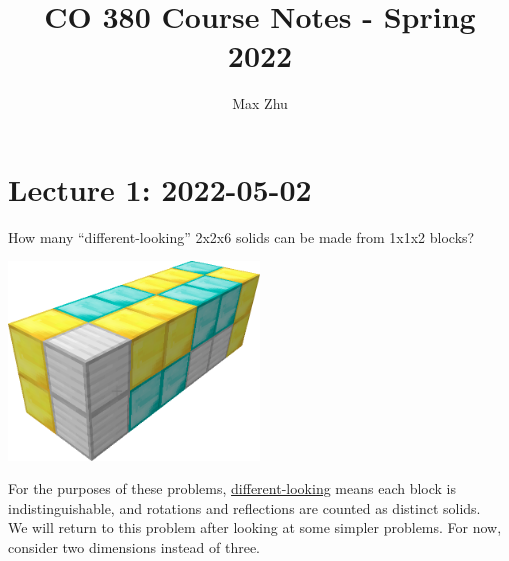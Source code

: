 \documentclass[12pt]{article}
\title{CO 380 Course Notes - Spring 2022}
\author{Max Zhu}
\begin{document}
	\maketitle
	\tableofcontents\newpage
	
    \section{Lecture 1: 2022-05-02}
    \begin{myprob}{}{}
        How many ``different-looking'' 2x2x6 solids can be made from 1x1x2 blocks?

        \begin{center}
            \includegraphics[width=0.5\textwidth]{Fig1.png}
        \end{center}
    \end{myprob}

    \begin{myrem}{}{}
        For the purposes of these problems, \underline{different-looking} means each block is indistinguishable, and rotations and reflections are counted as distinct solids.\\

        We will return to this problem after looking at some simpler problems. For now, consider two dimensions instead of three.
    \end{myrem}
\end{document}
